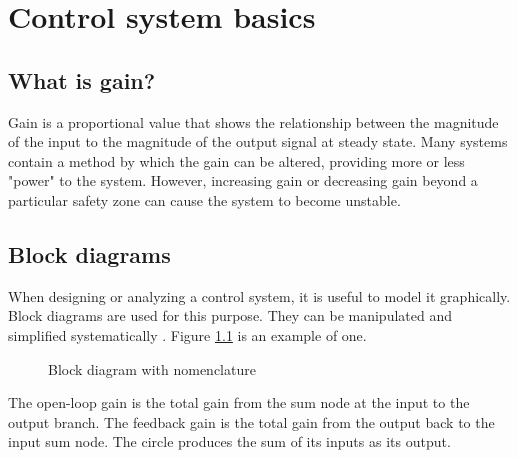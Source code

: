 \chapter{Control system basics}

\section{What is gain?}

Gain is a proportional value that shows the relationship between the magnitude
of the input to the magnitude of the output signal at steady state. Many
\glspl{system} contain a method by which the gain can be altered, providing more
or less "power" to the \gls{system}. However, increasing gain or decreasing gain
beyond a particular safety zone can cause the \gls{system} to become unstable.

\section{Block diagrams}

When designing or analyzing a control system, it is useful to model it
graphically. Block diagrams are used for this purpose. They can be manipulated
and simplified systematically \cite{bib:block_diagrams}. Figure
\ref{fig:gain_nomenclature} is an example of one.

\begin{figure}[H]
  \centering


  \caption{Block diagram with nomenclature}
  \label{fig:gain_nomenclature}
\end{figure}

The open-loop gain is the total gain from the sum node at the input to the
output branch. The feedback gain is the total gain from the output back to the
input sum node. The circle produces the sum of its inputs as its output.


